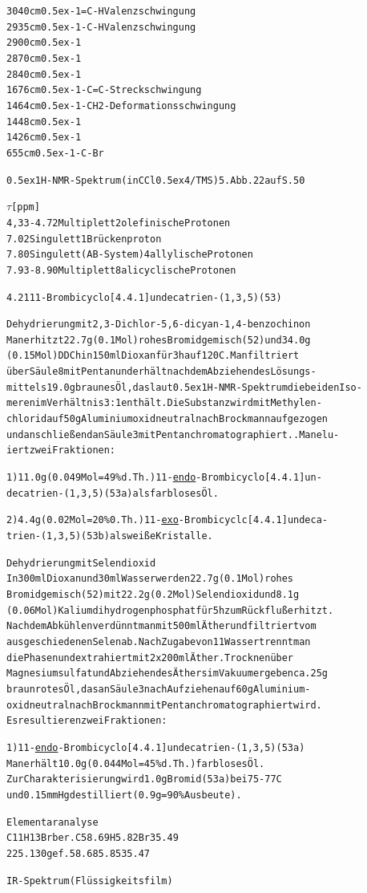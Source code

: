 \documentclass[a4paper,11pt]{article}
\begin{document}
\begin{alltt}

3040 cm\raise0.5ex\hbox{-1} =C-H Valenzschwingung
2935 cm\raise0.5ex\hbox{-1} -C-H Valenzschwingung
2900 cm\raise0.5ex\hbox{-1}
2870 cm\raise0.5ex\hbox{-1}
2840 cm\raise0.5ex\hbox{-1}
1676 cm\raise0.5ex\hbox{-1} -C=C- Streckschwingung
1464 cm\raise0.5ex\hbox{-1} -CH2- Deformationsschwingung
1448 cm\raise0.5ex\hbox{-1}
1426 cm\raise0.5ex\hbox{-1}
 655 cm\raise0.5ex\hbox{-1} -C-Br


\leavevmode\raise0.5ex\hbox{1}H-NMR-Spektrum (in CCl\lower0.5ex\hbox{4}/TMS) 5. Abb. 22 auf S. 50

  \(\tau\) [ppm]
4,33 - 4.72  Multiplett                 2 olefinische Protonen
7.02         Singulett                  1 Brückenproton
7.80         Singulett (AB-System)      4 allylische Protonen
7.93 - 8.90  Multiplett                 8 alicyclische Protonen


\newpage
{}


4.21 11-Brombicyclo[4.4.1]undecatrien-(1‚3,5) (53)

Dehydrierung mit 2,3-Dichlor-5,6-dicyan-1,4-benzochinon
Man erhitzt 22.7 g (0.1 Mol) rohes Bromidgemisch (52) und 34.0 g
(0.15 Mol) DDCh in 150 ml Dioxan für 3 h auf 120\degree{}C. Man filtriert
über Säule 8 mit Pentan und erhält nach dem Abziehen des Lösungs-
mittels 19.0 g braunes Öl, das laut \raise0.5ex\hbox{1}H-NMR-Spektrum die beiden Iso-
meren im Verhältnis 3:1 enthält. Die Substanz wird mit Methylen-
chlorid auf 50 g Aluminiumoxid neutral nach Brockmann aufgezogen
und anschließend an Säule 3 mit Pentan chromatographiert..Man elu-
iert zwei Fraktionen:

1) 11.0 g (0.049 Mol = 49 \% d.Th.) 11-\underline{endo}-Brombicyclo[4.4.1]un-
decatrien-(1,3‚5) (53a) als farbloses Öl.

2) 4.4 g (0.02 Mol = 20 \% 0.Th.) 11-\underline{exo}-Brombicyclc[4.4.1]undeca-
trien-(1‚3,5) (53b) als weiße Kristalle.

Dehydrierung mit Selendioxid
In 300 ml Dioxan und 30 ml Wasser werden 22.7 g (0.1 Mol) rohes
Bromidgemisch (52) mit 22.2 g (0.2 Mol) Selendioxid und 8.1 g
(0.06 Mol) Kaliumdihydrogenphosphat für 5 h zum Rückfluß erhitzt.
Nach dem Abkühlen verdünnt man mit 500 ml Äther und filtriert vom
ausgeschiedenen Selen ab. Nach Zugabe von 1 1 Wasser trennt man
die Phasen und extrahiert mit 2 x 200 ml Äther. Trocknen über
Magnesiumsulfat und Abziehen des Äthers im Vakuum ergeben ca. 25 g
braunrotes Öl, das an Säule 3 nach Aufziehen auf 60 g Aluminium-
oxid neutral nach Brockmann mit Pentan chromatographiert wird.
Es resultieren zwei Fraktionen:

1) 11-\underline{endo}-Brombicyclo[4.4.1]undecatrien-(1‚3,5) (53a)
Man erhält 10.0 g (0.044 Mol = 45 \% d.Th.) farbloses Öl.
Zur Charakterisierung wird 1.0 g Bromid (53a) bei 75 - 77\degree{}C
und 0.15 mm Hg destilliert (0.9 g = 90 \% Ausbeute).

\newpage
{}


Elementaranalyse
C11H13Br ber. C 58.69 H 5.82 Br 35.49
225.130  gef.   58.68   5.85    35.47

IR-Spektrum (Flüssigkeitsfilm)
\end{alltt}
\end{document}
